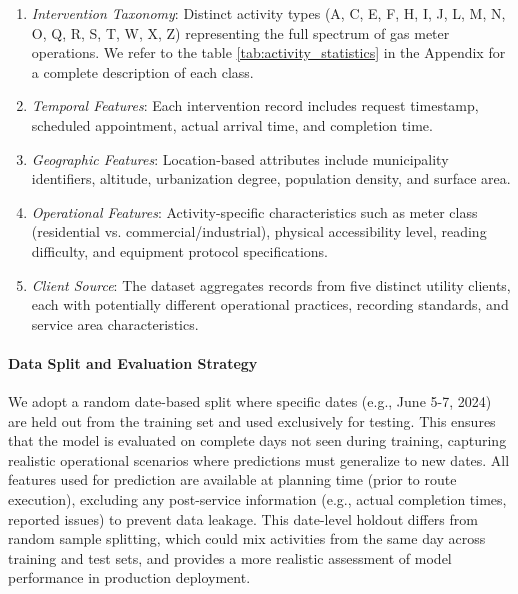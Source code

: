 \documentclass[preprint,12pt]{elsarticle}
\begin{document}
\begin{enumerate}
    
\item \textit{Intervention Taxonomy}:  Distinct activity types (A, C, E, F, H, I, J, L, M, N, O, Q, R, S, T, W, X, Z)  representing the full spectrum of gas meter operations. We refer to the table \ref{tab:activity_statistics} in the Appendix for a complete description of each class.

\item \textit{Temporal Features}: Each intervention record includes request timestamp, scheduled appointment, actual arrival time, and completion time.

\item \textit{Geographic Features}: Location-based attributes include municipality identifiers, altitude, urbanization degree, population density, and surface area.

\item \textit{Operational Features}: Activity-specific characteristics such as meter class (residential vs. commercial/industrial), physical accessibility level, reading difficulty, and equipment protocol specifications.

\item \textit{Client Source}: The dataset aggregates records from five distinct utility clients, each with potentially different operational practices, recording standards, and service area characteristics.
\end{enumerate}

\paragraph{Data Split and Evaluation Strategy} We adopt a random date-based split where specific dates (e.g., June 5-7, 2024) are held out from the training set and used exclusively for testing. This ensures that the model is evaluated on complete days not seen during training, capturing realistic operational scenarios where predictions must generalize to new dates. All features used for prediction are available at planning time (prior to route execution), excluding any post-service information (e.g., actual completion times, reported issues) to prevent data leakage. This date-level holdout differs from random sample splitting, which could mix activities from the same day across training and test sets, and provides a more realistic assessment of model performance in production deployment.
\end{document}
